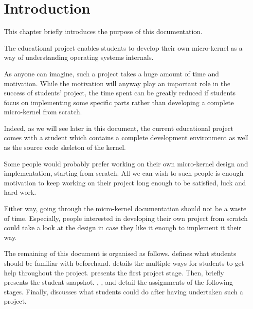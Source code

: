 %
%
%
%
%
%

%
%

\chapter{Introduction}
\label{chapter:introduction}

This chapter briefly introduces the purpose of this documentation.

\newpage

%
%

The  educational project enables students to develop their own
micro-kernel as a way of understanding operating systems internals.

As anyone can imagine, such a project takes a huge amount of time and
motivation. While the motivation will anyway play an important role in the
success of students' project, the time spent can be greatly reduced if
students focus on implementing some specific parts rather than developing a
complete micro-kernel from scratch.

Indeed, as we will see later in this document, the current 
educational project comes with a student  which contains
a complete development environment as well as the source code skeleton of
the kernel.

Some people would probably prefer working on their own micro-kernel design
and implementation, starting from scratch. All we can wish to such people
is enough motivation to keep working on their project long enough to be
satisfied, luck and hard work.

Either way, going through the  micro-kernel documentation
should not be a waste of time. Especially, people interested in developing
their own project from scratch could take a look at the  design
in case they like it enough to implement it their way.

The remaining of this document is organised as follows.  defines what students should be familiar with
beforehand.  details the multiple
ways for students to get help throughout the project.  presents the first project stage. Then,  briefly presents the student snapshot.
, ,
 and  detail the assignments of the following stages. Finally,
 discusses what students could do
after having undertaken such a project.
